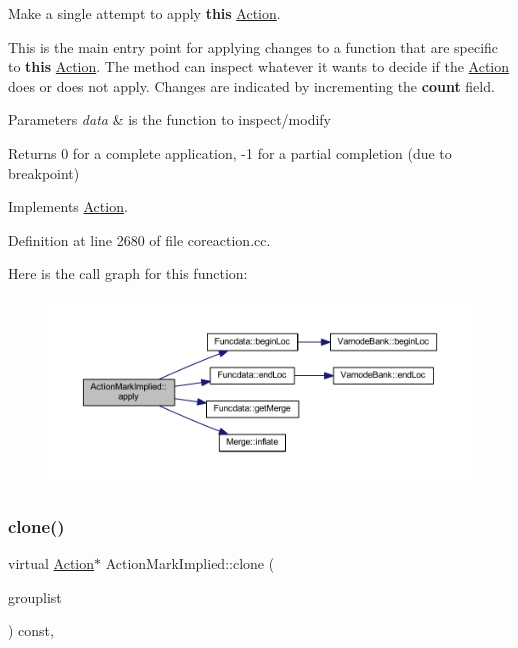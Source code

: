 Make a single attempt to apply {\bfseries{this}} \mbox{\hyperlink{class_action}{Action}}. 

This is the main entry point for applying changes to a function that are specific to {\bfseries{this}} \mbox{\hyperlink{class_action}{Action}}. The method can inspect whatever it wants to decide if the \mbox{\hyperlink{class_action}{Action}} does or does not apply. Changes are indicated by incrementing the {\bfseries{count}} field. 
\begin{DoxyParams}{Parameters}
{\em data} & is the function to inspect/modify \\
\hline
\end{DoxyParams}
\begin{DoxyReturn}{Returns}
0 for a complete application, -\/1 for a partial completion (due to breakpoint) 
\end{DoxyReturn}


Implements \mbox{\hyperlink{class_action_aac1c3999d6c685b15f5d9765a4d04173}{Action}}.



Definition at line 2680 of file coreaction.\+cc.

Here is the call graph for this function\+:
\nopagebreak
\begin{figure}[H]
\begin{center}
\leavevmode
\includegraphics[width=350pt]{class_action_mark_implied_a775f99086570c42e2bc89de67bbc9867_cgraph}
\end{center}
\end{figure}
\mbox{\label{class_action_mark_implied_a62ce03beb8aa31dd00531c48d6ce5510}} 
\subsubsection{\texorpdfstring{clone()}{clone()}}
{\footnotesize\ttfamily virtual \mbox{\hyperlink{class_action}{Action}}$\ast$ Action\+Mark\+Implied\+::clone (\begin{DoxyParamCaption}\item[{const \mbox{\hyperlink{class_action_group_list}{Action\+Group\+List}} \&}]{grouplist }\end{DoxyParamCaption}) const\hspace{0.3cm}{\ttfamily [inline]}, {\ttfamily [virtual]}}



